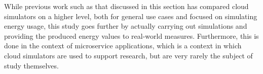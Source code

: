 While previous work such as that discussed in this section has compared cloud simulators on a higher level, both for general use cases and focused on simulating energy usage, this study goes further by actually carrying out simulations and providing the produced energy values to real-world measures. Furthermore, this is done in the context of microservice applications, which is a context in which cloud simulators are used to support research, but are very rarely the subject of study themselves.

